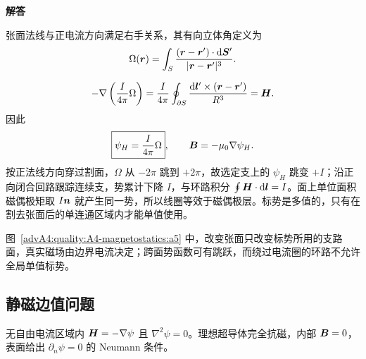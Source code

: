 \begin{advsolution}
\begin{center}\begin{minipage}{.96\linewidth}\centering
\raggedright{\bfseries\color{DeepBlue}解答}\par\smallskip\centering

\label{advA4:quality:A4-magnetostatics:a5}
\end{minipage}\end{center}

张面法线与正电流方向满足右手关系，其有向立体角定义为
\[
 \Omega(\bm{r})=\int_S
 \frac{(\bm{r}-\bm{r}')\cdot\mathop{}\!\mathrm d\bm{S}'}{|\bm{r}-\bm{r}'|^3}.
\]


\[
 -\nabla\left(\frac I{4\pi}\Omega\right)
 =\frac I{4\pi}\oint_{\partial S}
 \frac{\mathop{}\!\mathrm d\bm{l}'\times(\bm{r}-\bm{r}')}{R^3}
 =\bm{H}.
\]
因此
\[
 \boxed{\psi_H=\frac I{4\pi}\Omega},
 \qquad \bm{B}=-\mu_0\nabla\psi_H.
\]
按正法线方向穿过割面，$\Omega$ 从 $-2\pi$ 跳到 $+2\pi$，故选定支上的 $\psi_H$ 跳变 $+I$；沿正向闭合回路跟踪连续支，势累计下降 $I$，与环路积分
$\oint\bm{H}\cdot\mathop{}\!\mathrm d\bm{l}=I$。面上单位面积磁偶极矩取
$I\bm{n}$ 就产生同一势，所以线圈等效于磁偶极层。标势是多值的，只有在割去张面后的单连通区域内才能单值使用。

图~\ref{advA4:quality:A4-magnetostatics:a5} 中，改变张面只改变标势所用的支路面，真实磁场由边界电流决定；跨面势函数可有跳跃，而绕过电流圈的环路不允许全局单值标势。
\end{advsolution}

\subsection{静磁边值问题}

无自由电流区域内 $\bm{H}=-\nabla\psi$ 且 $\nabla^2\psi=0$。理想超导体完全抗磁，内部 $\bm{B}=0$，表面给出
$\partial_n\psi=0$ 的 Neumann 条件。

